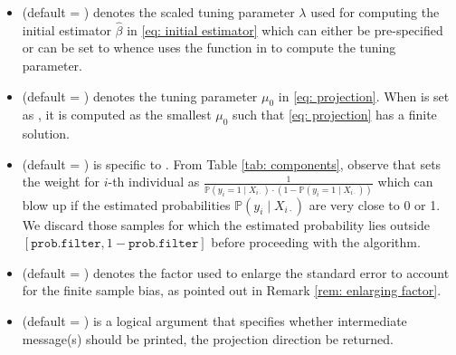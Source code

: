 \begin{itemize}
\item {} (default = ) denotes the scaled tuning parameter $\lambda$ used for computing the initial estimator $\widehat{\beta}$ in \eqref{eq: initial estimator} which can either be pre-specified or can be set to  whence  uses the function  in  to compute the tuning parameter.

\item {} (default = ) denotes the tuning parameter $\mu_0$ in \eqref{eq: projection}. When  is set as , it is computed as the smallest $\mu_0$ such that \eqref{eq: projection} has a finite solution. %

\item {} (default = ) is specific to . From Table \ref{tab: components}, observe that  sets the weight for $i$-th individual as $\frac{1}{\mathbb{P}(y_i = 1\mid X_{i\cdot})\cdot(1-\mathbb{P}(y_i = 1\mid X_{i\cdot}))}$ which can blow up if the estimated probabilities $\mathbb{P}(y_i \mid X_{i\cdot})$ are very close to 0 or 1. We discard those samples for which the estimated probability lies outside $[\texttt{prob.filter},1-\texttt{prob.filter}]$ before proceeding with the algorithm.

\item {} (default = ) denotes the factor used to enlarge the standard error to account for the finite sample {bias, as pointed out in Remark \ref{rem: enlarging factor}}. %

\item {} (default = ) is a logical argument that specifies whether intermediate message(s) should be printed, the projection direction be returned. 
\end{itemize}

